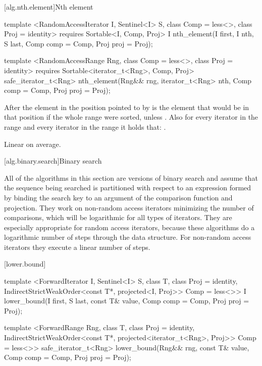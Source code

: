 [alg.nth.element]{Nth element}

%
\begin{itemdecl}
template <RandomAccessIterator I, Sentinel<I> S, class Comp = less<>,
    class Proj = identity>
  requires Sortable<I, Comp, Proj>
  I nth_element(I first, I nth, S last, Comp comp = Comp{}, Proj proj = Proj{});

template <RandomAccessRange Rng, class Comp = less<>, class Proj = identity>
  requires Sortable<iterator_t<Rng>, Comp, Proj>
  safe_iterator_t<Rng>
    nth_element(Rng&& rng, iterator_t<Rng> nth, Comp comp = Comp{}, Proj proj = Proj{});
\end{itemdecl}

\begin{itemdescr}
\pnum
After
the element in the position pointed to by 
is the element that would be
in that position if the whole range were sorted, unless .
Also for every iterator
in the range
and every iterator
in the range
it holds that:
.

\pnum
\complexity
Linear on average.
\end{itemdescr}

[alg.binary.search]{Binary search}

\pnum
All of the algorithms in this section are versions of binary search
and assume that the sequence being searched is partitioned with respect to
an expression formed by binding the search key to an argument of the
comparison function and projection.
They work on non-random access iterators minimizing the number of comparisons,
which will be logarithmic for all types of iterators.
They are especially appropriate for random access iterators,
because these algorithms do a logarithmic number of steps
through the data structure.
For non-random access iterators they execute a linear number of steps.

[lower.bound]{}

%
\begin{itemdecl}
template <ForwardIterator I, Sentinel<I> S, class T, class Proj = identity,
    IndirectStrictWeakOrder<const T*, projected<I, Proj>> Comp = less<>>
  I
    lower_bound(I first, S last, const T& value, Comp comp = Comp{},
                Proj proj = Proj{});

template <ForwardRange Rng, class T, class Proj = identity,
    IndirectStrictWeakOrder<const T*, projected<iterator_t<Rng>, Proj>> Comp = less<>>
  safe_iterator_t<Rng>
    lower_bound(Rng&& rng, const T& value, Comp comp = Comp{}, Proj proj = Proj{});
\end{itemdecl}

